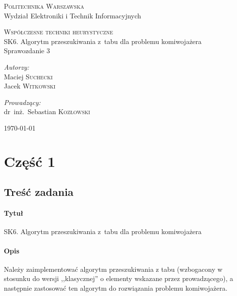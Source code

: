 \documentclass[11pt,a4paper]{article}
\begin{document}
\begin{titlepage}
  \begin{center}

    \textsc{\Large Politechnika Warszawska}\\[0.1cm]
    \small Wydział Elektroniki i Technik Informacyjnych
    \vfill

    \textsc{\small Współczesne techniki heurystyczne}\\[0.1cm]
    \Huge SK6. Algorytm przeszukiwania z~tabu dla problemu komiwojażera\\[1.5cm]
    \small Sprawozdanie 3\\[2.5cm]

    \vfill

    \begin{minipage}{0.4\textwidth}
      \begin{flushleft} \large
        \emph{Autorzy:}\\[0.1cm]
        Maciej \textsc{Suchecki}\\
        Jacek \textsc{Witkowski}\\
      \end{flushleft}
    \end{minipage}
    \begin{minipage}{0.4\textwidth}
      \begin{flushright} \large
        \emph{Prowadzący:}\\[0.1cm]
        dr~inż.~Sebastian \textsc{Kozłowski}\\[1cm]
      \end{flushright}
    \end{minipage}

    \vfill
    {\large \today}

  \end{center}
\end{titlepage}

\section{Część 1}
\subsection{Treść zadania}
\paragraph{Tytuł} SK6. Algorytm przeszukiwania z~tabu dla problemu komiwojażera
\paragraph{Opis} Należy zaimplementować algorytm przeszukiwania z tabu (wzbogacony w stosunku do wersji ,,klasycznej'' o elementy wskazane przez prowadzącego), a następnie zastosować ten algorytm do rozwiązania problemu komiwojażera.
\end{document}
